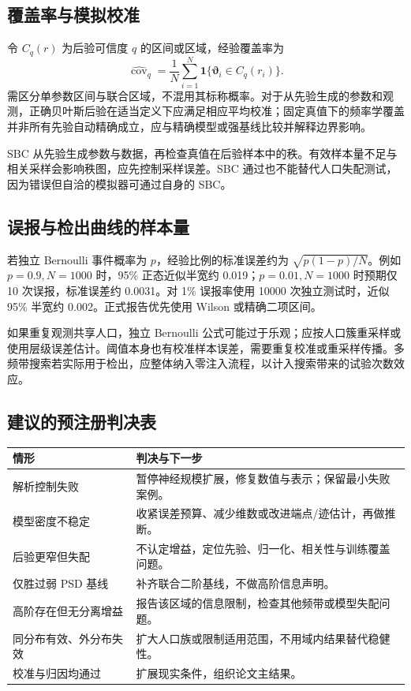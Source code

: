 \documentclass[UTF8,fontset=fandol,a4paper,11pt]{ctexart}
\numberwithin{equation}{section}
\newcommand{\btheta}{\boldsymbol\vartheta}
\begin{document}
\subsection{覆盖率与模拟校准}
令 $C_q(r)$ 为后验可信度 $q$ 的区间或区域，经验覆盖率为
\begin{equation}
\widehat{\operatorname{cov}}_q=\frac1N\sum_{i=1}^N
\boldsymbol1\{\btheta_i\in C_q(r_i)\}.
\end{equation}
需区分单参数区间与联合区域，不混用其标称概率。对于从先验生成的参数和观测，正确贝叶斯后验在适当定义下应满足相应平均校准；固定真值下的频率学覆盖并非所有先验自动精确成立，应与精确模型或强基线比较并解释边界影响。

SBC 从先验生成参数与数据，再检查真值在后验样本中的秩。有效样本量不足与相关采样会影响秩图，应先控制采样误差。SBC 通过也不能替代人口失配测试，因为错误但自洽的模拟器可通过自身的 SBC。

\subsection{误报与检出曲线的样本量}
若独立 Bernoulli 事件概率为 $p$，经验比例的标准误差约为 $\sqrt{p(1-p)/N}$。例如 $p=0.9,N=1000$ 时，95\% 正态近似半宽约 0.019；$p=0.01,N=1000$ 时预期仅 10 次误报，标准误差约 0.0031。对 1\% 误报率使用 10000 次独立测试时，近似 95\% 半宽约 0.002。正式报告优先使用 Wilson 或精确二项区间。

如果重复观测共享人口，独立 Bernoulli 公式可能过于乐观；应按人口簇重采样或使用层级误差估计。阈值本身也有校准样本误差，需要重复校准或重采样传播。多频带搜索若实际用于检出，应整体纳入零注入流程，以计入搜索带来的试验次数效应。

\subsection{建议的预注册判决表}
\noindent\begin{tabularx}{\linewidth}{P{3.2cm}Y}
\toprule 情形 & 判决与下一步\\\midrule
解析控制失败 & 暂停神经规模扩展，修复数值与表示；保留最小失败案例。\\
模型密度不稳定 & 收紧误差预算、减少维数或改进端点/迹估计，再做推断。\\
后验更窄但失配 & 不认定增益，定位先验、归一化、相关性与训练覆盖问题。\\
仅胜过弱 PSD 基线 & 补齐联合二阶基线，不做高阶信息声明。\\
高阶存在但无分离增益 & 报告该区域的信息限制，检查其他频带或模型失配问题。\\
同分布有效、外分布失效 & 扩大人口族或限制适用范围，不用域内结果替代稳健性。\\
校准与归因均通过 & 扩展现实条件，组织论文主结果。\\\bottomrule
\end{tabularx}
\end{document}
